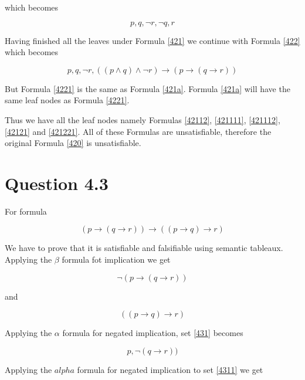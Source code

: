 \documentclass[10pt,a4paper]{article}
\begin{document}
which becomes

\begin{equation}
\label{421221}
p, q, \neg r, \neg q,  r 
\end{equation} 
 
Having finished all the leaves under Formula \ref{421} we continue with Formula \ref{422} which becomes

\begin{equation}
\label{4221}
 p, q, \neg r,  (( p \wedge q) \wedge \neg r) \rightarrow (p \rightarrow ( q \rightarrow r )) 
\end{equation} 

But Formula \ref{4221} is the same as Formula \ref{421a}. Formula \ref{421a} will have the same leaf nodes as Formula \ref{4221}.

Thus we have all the leaf nodes namely Formulas \ref{42112}, \ref{421111}, \ref{421112}, \ref{42121} and \ref{421221}. All of these Formulas are unsatisfiable, 
therefore the original Formula \ref{420} is unsatisfiable.

\section{Question 4.3}

For formula 

\begin{equation}
\label{430}
(p \rightarrow (q \rightarrow r)) \rightarrow ((p \rightarrow q)  \rightarrow r)
\end{equation}

We have to prove that it is satisfiable and falsifiable using semantic tableaux. Applying the $\beta$ formula fot implication we get

\begin{equation}
\label{431}
 \neg (p \rightarrow (q \rightarrow r)) 
\end{equation}

and

\begin{equation}
 \label{432}
 ((p \rightarrow q)  \rightarrow r)
\end{equation}

Applying the $\alpha$ formula for negated implication, set \ref{431} becomes


\begin{equation}
\label{4311}
p, \neg (q \rightarrow r)) 
\end{equation}

Applying the $alpha$ formula for negated implication to set \ref{4311} we get
\end{document}
